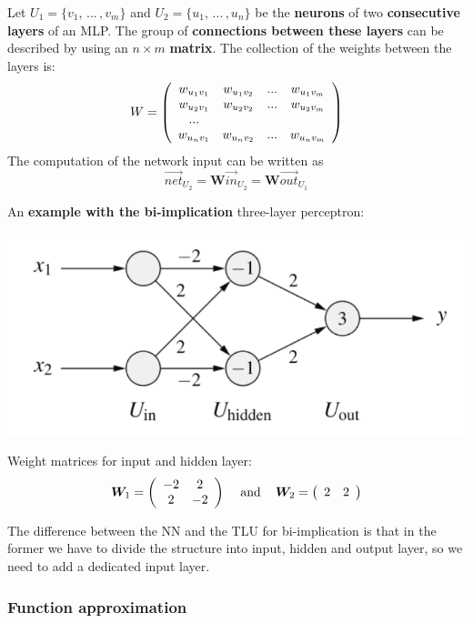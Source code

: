 \documentclass[11pt]{article}
\begin{document}
		\newpage
		
		Let $U_1 = \{v_1, \, ... \, , v_m \}$ and $U_2 = \{u_1, \, ... \, , u_n\}$ be the \textbf{neurons} of two \textbf{consecutive layers} of an MLP. The group of \textbf{connections between these layers} can be described by using an $n \times m$ \textbf{matrix}. The collection of the weights between the layers is: 
		$$ 
		W = \left(
		\begin{array}{c c c c}
			w_{u_1 v_1} & w_{u_1 v_2} & ... & w_{u_1 v_m} \\
			w_{u_2 v_1} & w_{u_2 v_2} & ... & w_{u_2 v_m} \\
			... \\
			w_{u_n v_1} & w_{u_n v_2} & ... & w_{u_n v_m} 
		\end{array}
		\right)
		$$
		The computation of the network input can be written as 
		$$ \vec{net}_{U_2} = \bm{W} \vec{in}_{U_2} = \bm{W} \vec{out}_{U_1} $$
		
		An \textbf{example with the bi-implication} three-layer perceptron:
		\begin{center}
			\includegraphics[width=0.65\columnwidth]{img/NN/bi_impl1}
		\end{center}
		Weight matrices for input and hidden layer: 
		$$ \bm{W}_1 = \left(
		\begin{array}{c c}
			-2 & 2 \\
			2 & -2 
		\end{array}
		\right)
		\;\;\; \text{ and } \;\;\;
		\bm{W}_2 = \left(
		\begin{array}{c c}
			2 & 2 \\
		\end{array}
		\right)
		$$
		
		The difference between the NN and the TLU for bi-implication is that in the former we have to divide the structure into input, hidden and output layer, so we need to add a dedicated input layer.\\
		
		\newpage
		
		\subsubsection{Function approximation}
		
\end{document}
